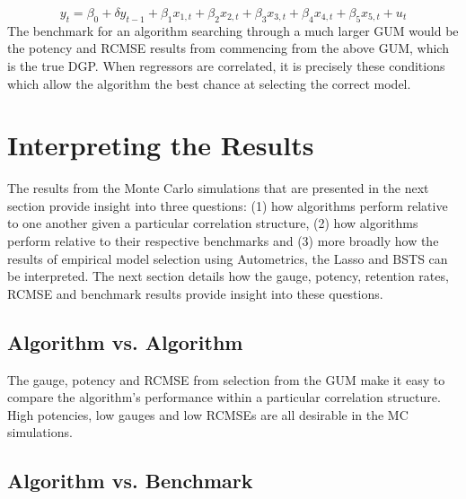 $$y_{t}=\beta_{0} + \delta y_{t-1}+\beta_{1}x_{1,t}+\beta_{2}x_{2,t}+ \beta_{3}x_{3,t}+ \beta_{4}x_{4,t}+ \beta_{5}x_{5,t} + u_{t}$$
The benchmark for an algorithm searching through a much larger GUM would be the potency and RCMSE results from commencing from the above GUM, which is the true DGP. When regressors are correlated, it is precisely these conditions which allow the algorithm the best chance at selecting the correct model. 




\section{Interpreting the Results}

The results from the Monte Carlo simulations that are presented in the next section provide insight into three questions: (1) how algorithms perform relative to one another given a particular correlation structure, (2) how algorithms perform relative to their respective benchmarks and (3) more broadly how the results of empirical model selection using Autometrics, the Lasso and BSTS can be interpreted. The next section details how the gauge, potency, retention rates, RCMSE and benchmark results provide insight into these questions.

\subsection{Algorithm vs. Algorithm}

The gauge, potency and RCMSE from selection from the GUM make it easy to compare the algorithm's performance within a particular correlation structure.  High potencies, low gauges and low RCMSEs are all desirable in the MC simulations. 

\subsection{Algorithm vs. Benchmark}

